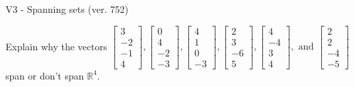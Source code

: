 \begin{exercise}
  \begin{exerciseTitle}V3 - Spanning sets (ver. 752)\end{exerciseTitle}
  \begin{exerciseStatement}
    Explain why the vectors \(\left[\begin{array}{r}
3 \\
-2 \\
-1 \\
4
\end{array}\right] , \left[\begin{array}{r}
0 \\
4 \\
-2 \\
-3
\end{array}\right] , \left[\begin{array}{r}
4 \\
1 \\
0 \\
-3
\end{array}\right] , \left[\begin{array}{r}
2 \\
3 \\
-6 \\
5
\end{array}\right] , \left[\begin{array}{r}
4 \\
-4 \\
3 \\
4
\end{array}\right] , \text{ and } \left[\begin{array}{r}
2 \\
2 \\
-4 \\
-5
\end{array}\right]\) span or don't span \(\mathbb{R}^4\). 
	



\end{exerciseStatement}
\end{exercise}
